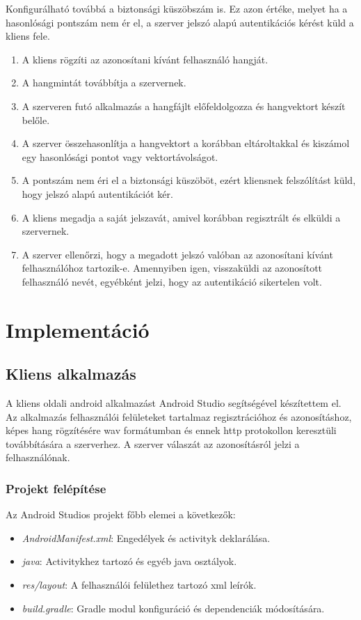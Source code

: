 Konfigurálható továbbá a biztonsági küszöbszám is. Ez azon értéke, melyet
ha a hasonlósági pontszám nem ér el, a szerver jelszó alapú autentikációs kérést küld a kliens fele.

\begin{enumerate}
	\item A kliens rögzíti az azonosítani kívánt felhasználó hangját.
	\item A hangmintát továbbítja a szervernek.
	\item A szerveren futó alkalmazás a hangfájlt előfeldolgozza és hangvektort készít belőle.
	\item A szerver összehasonlítja a hangvektort a korábban eltároltakkal és kiszámol egy hasonlósági pontot vagy vektortávolságot.
	\item A pontszám nem éri el a biztonsági küszöböt, ezért kliensnek felszólítást küld, hogy jelszó alapú autentikációt kér.
	\item A kliens megadja a saját jelszavát, amivel  korábban regisztrált és elküldi a szervernek.
	\item A szerver ellenőrzi, hogy a megadott jelszó valóban az azonosítani kívánt felhasználóhoz tartozik-e. Amennyiben igen, visszaküldi az azonosított felhasználó nevét,
	egyébként jelzi, hogy az autentikáció sikertelen volt.
\end{enumerate}

\section{Implementáció}

\subsection{Kliens alkalmazás}

A kliens oldali android alkalmazást Android Studio segítségével készítettem el. Az alkalmazás felhasználói felületeket tartalmaz regisztrációhoz és azonosításhoz, képes hang rögzítésére wav formátumban és ennek http protokollon keresztüli továbbítására a szerverhez. A szerver válaszát az azonosításról jelzi a felhasználónak. 

\subsubsection{Projekt felépítése}

Az Android Studios projekt főbb elemei a következők:

\begin{itemize}
	\item \emph{AndroidManifest.xml}: Engedélyek és activityk deklarálása.
	\item \emph{java}: Activitykhez tartozó és egyéb java osztályok.
	\item \emph{res/layout}: A felhasználói felülethez tartozó xml leírók.
	\item \emph{build.gradle}: Gradle modul konfiguráció és dependenciák módosítására.
\end{itemize}

